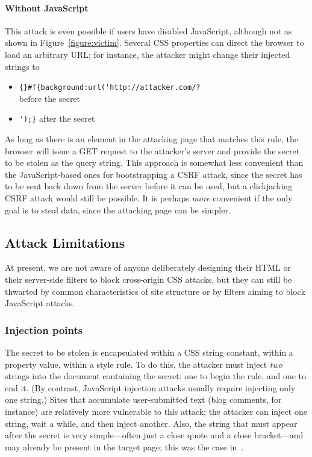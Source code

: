 \documentclass{acm_proc_article-sp}
\begin{document}
\paragraph{Without JavaScript}
This attack is even possible if users have disabled JavaScript,
although not as shown in Figure~\ref{figure:victim}.  Several CSS
properties can direct the browser to load an arbitrary URL; for
instance, the attacker might change their injected strings to

\begin{itemize}
\item \verb|{}#f{background:url('http://attacker.com/?|\\
  before the secret
\item \verb|');}| after the secret
\end{itemize}

As long as there is an element in the attacking page that matches this
rule, the browser will issue a GET request to the attacker's server
and provide the secret to be stolen as the query string.  This
approach is somewhat less convenient than the JavaScript-based ones
for bootstrapping a CSRF attack, since the secret has to be sent back
down from the server before it can be used, but a
clickjacking~\cite{clickjacking} CSRF attack would still be possible.
It is perhaps \emph{more} convenient if the only goal is to steal
data, since the attacking page can be simpler.

\subsection{Attack Limitations}
At present, we are not aware of anyone deliberately designing their
HTML or their server-side filters to block cross-origin CSS attacks,
but they can still be thwarted by common characteristics of site
structure or by filters aiming to block JavaScript attacks.

\subsubsection{Injection points}
The secret to be stolen is encapsulated within a CSS string constant,
within a property value, within a style rule.  To do this, the
attacker must inject \emph{two} strings into the document containing
the secret: one to begin the rule, and one to end it.  (By contrast,
JavaScript injection attacks usually require injecting only one
string.)  Sites that accumulate user-submitted text (blog comments,
for instance) are relatively more vulnerable to this attack; the
attacker can inject one string, wait a while, and then inject another.
Also, the string that must appear after the secret is very
simple---often just a close quote and a close bracket---and may
already be present in the target page; this was the case
in~\cite{cssxss08}.
\end{document}
